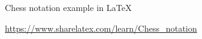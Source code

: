 \documentclass{article}
\begin{document}
Chess notation example in \LaTeX{}

\medskip
\url{https://www.sharelatex.com/learn/Chess_notation}

\newgame
\showboard\\
\\
\showboard\\

\\
\\
\showboard\\
\end{document}
